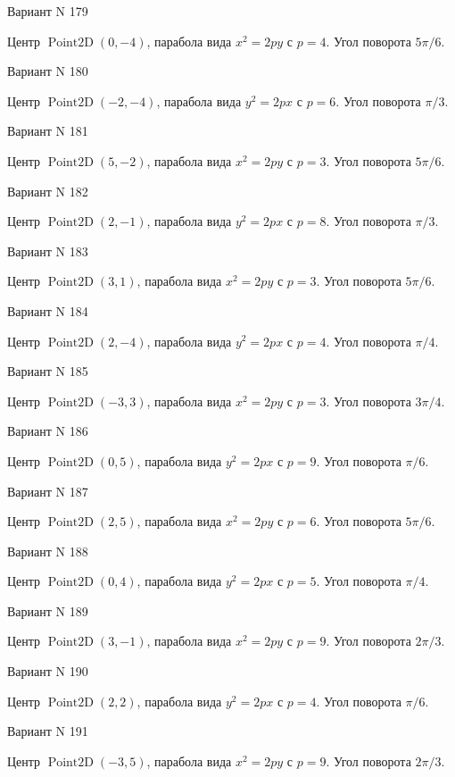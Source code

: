 \documentclass[11pt]{report}
\begin{document}
Вариант N 179

Центр $\operatorname{Point2D}\left(0, -4\right)$, парабола вида $x^{2} = 2py$ с $p = 4$. Угол поворота $5 \pi / 6$.

Вариант N 180

Центр $\operatorname{Point2D}\left(-2, -4\right)$, парабола вида $y^{2} = 2px$ с $p = 6$. Угол поворота $\pi / 3$.

Вариант N 181

Центр $\operatorname{Point2D}\left(5, -2\right)$, парабола вида $x^{2} = 2py$ с $p = 3$. Угол поворота $5 \pi / 6$.

Вариант N 182

Центр $\operatorname{Point2D}\left(2, -1\right)$, парабола вида $y^{2} = 2px$ с $p = 8$. Угол поворота $\pi / 3$.

Вариант N 183

Центр $\operatorname{Point2D}\left(3, 1\right)$, парабола вида $x^{2} = 2py$ с $p = 3$. Угол поворота $5 \pi / 6$.

Вариант N 184

Центр $\operatorname{Point2D}\left(2, -4\right)$, парабола вида $y^{2} = 2px$ с $p = 4$. Угол поворота $\pi / 4$.

Вариант N 185

Центр $\operatorname{Point2D}\left(-3, 3\right)$, парабола вида $x^{2} = 2py$ с $p = 3$. Угол поворота $3 \pi / 4$.

Вариант N 186

Центр $\operatorname{Point2D}\left(0, 5\right)$, парабола вида $y^{2} = 2px$ с $p = 9$. Угол поворота $\pi / 6$.

Вариант N 187

Центр $\operatorname{Point2D}\left(2, 5\right)$, парабола вида $x^{2} = 2py$ с $p = 6$. Угол поворота $5 \pi / 6$.

Вариант N 188

Центр $\operatorname{Point2D}\left(0, 4\right)$, парабола вида $y^{2} = 2px$ с $p = 5$. Угол поворота $\pi / 4$.

Вариант N 189

Центр $\operatorname{Point2D}\left(3, -1\right)$, парабола вида $x^{2} = 2py$ с $p = 9$. Угол поворота $2 \pi / 3$.

Вариант N 190

Центр $\operatorname{Point2D}\left(2, 2\right)$, парабола вида $y^{2} = 2px$ с $p = 4$. Угол поворота $\pi / 6$.

Вариант N 191

Центр $\operatorname{Point2D}\left(-3, 5\right)$, парабола вида $x^{2} = 2py$ с $p = 9$. Угол поворота $2 \pi / 3$.
\end{document}
